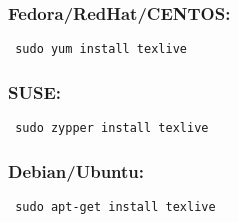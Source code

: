 \subsubsection*{Fedora/RedHat/CENTOS:}
\begin{verbatim} sudo yum install texlive \end{verbatim}


\subsubsection*{SUSE:}
\begin{verbatim} sudo zypper install texlive \end{verbatim}


\subsubsection*{Debian/Ubuntu:}
\begin{verbatim} sudo apt-get install texlive \end{verbatim}
